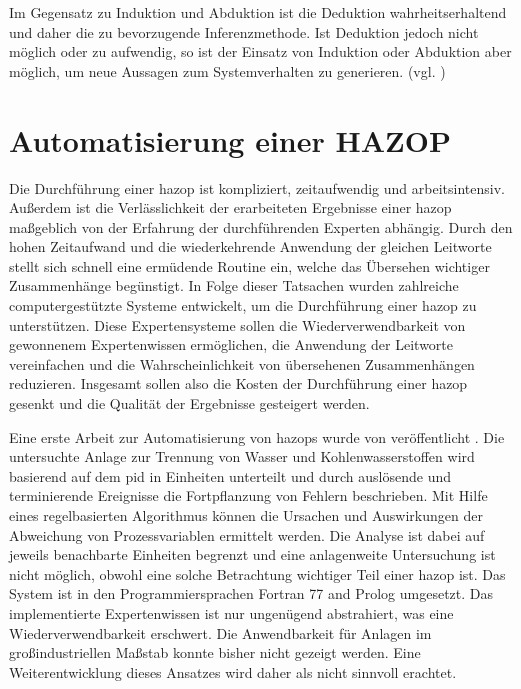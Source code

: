 Im Gegensatz zu Induktion und Abduktion ist die Deduktion wahrheitserhaltend und daher die zu bevorzugende Inferenzmethode. Ist Deduktion jedoch nicht m\"oglich oder zu aufwendig, so ist der Einsatz von Induktion oder Abduktion aber m\"oglich, um neue Aussagen zum Systemverhalten zu generieren. {(vgl. \cite[S. 28 ff.]{Dengel_2012})}

\section{Automatisierung einer HAZOP} \label{sec:fAna_automatHazop}
Die Durchf\"uhrung einer \ac{hazop} ist kompliziert, zeitaufwendig und arbeitsintensiv. Au\ss{}erdem ist die Verl\"asslichkeit der erarbeiteten Ergebnisse einer \ac{hazop} ma\ss{}geblich von der Erfahrung der durchf\"uhrenden Experten abh\"angig. Durch den hohen Zeitaufwand und die wiederkehrende Anwendung der gleichen Leitworte stellt sich schnell eine erm\"udende Routine ein, welche das \"Ubersehen wichtiger Zusammenh\"ange beg\"unstigt. In Folge dieser Tatsachen wurden zahlreiche computergest\"utzte Systeme entwickelt, um die Durchf\"uhrung einer \ac{hazop} zu unterst\"utzen. Diese Expertensysteme sollen die Wiederverwendbarkeit von gewonnenem Expertenwissen erm\"oglichen, die Anwendung der Leitworte vereinfachen und die Wahrscheinlichkeit von \"ubersehenen Zusammenh\"angen reduzieren. Insgesamt sollen also die Kosten der Durchf\"uhrung einer \ac{hazop} gesenkt und die Qualit\"at der Ergebnisse gesteigert werden. 

Eine erste Arbeit zur Automatisierung von \acp{hazop} wurde von \citeauthor{Parmar_1987} ver\"offentlicht \cite{Parmar_1987,Parmar_1987a}. Die untersuchte Anlage zur Trennung von Wasser und Kohlenwasserstoffen wird basierend auf dem \ac{pid} in Einheiten unterteilt und durch ausl\"osende und terminierende Ereignisse die Fortpflanzung von Fehlern beschrieben. Mit Hilfe eines regelbasierten Algorithmus k\"onnen die Ursachen und Auswirkungen der Abweichung von Prozessvariablen ermittelt werden. Die Analyse ist dabei auf jeweils benachbarte Einheiten begrenzt und eine anlagenweite Untersuchung ist nicht m\"oglich, obwohl eine solche Betrachtung  wichtiger Teil einer \ac{hazop} ist. Das System ist in den Programmiersprachen Fortran 77 and Prolog umgesetzt. Das implementierte Expertenwissen ist nur ungen\"ugend abstrahiert, was eine Wiederverwendbarkeit erschwert. Die Anwendbarkeit f\"ur Anlagen im gro\ss{}industriellen Ma\ss{}stab konnte bisher nicht gezeigt werden. Eine Weiterentwicklung dieses Ansatzes wird daher als nicht sinnvoll erachtet.

